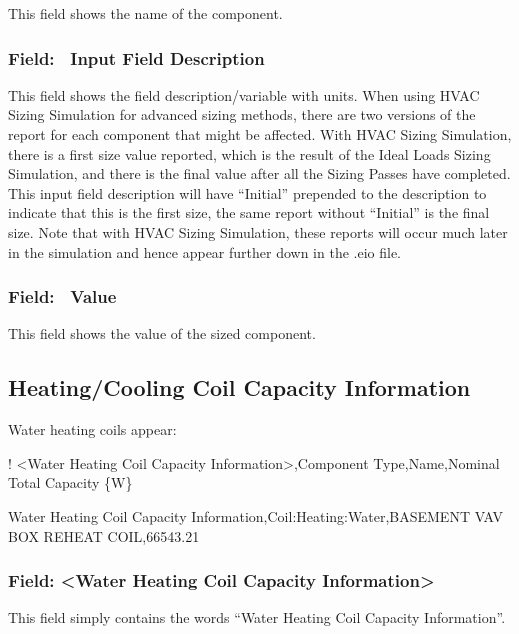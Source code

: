 This field shows the name of the component.

\subsubsection{Field: ~Input Field Description}\label{field-input-field-description}

This field shows the field description/variable with units. When using HVAC Sizing Simulation for advanced sizing methods, there are two versions of the report for each component that might be affected. With HVAC Sizing Simulation, there is a first size value reported, which is the result of the Ideal Loads Sizing Simulation, and there is the final value after all the Sizing Passes have completed. This input field description will have ``Initial'' prepended to the description to indicate that this is the first size, the same report without ``Initial'' is the final size. Note that with HVAC Sizing Simulation, these reports will occur much later in the simulation and hence appear further down in the .eio file.

\subsubsection{Field: ~Value}\label{field-value-2}

This field shows the value of the sized component.

\subsection{Heating/Cooling Coil Capacity Information}\label{heatingcooling-coil-capacity-information}

Water heating coils appear:

! \textless{}Water Heating Coil Capacity Information\textgreater{},Component Type,Name,Nominal Total Capacity \{W\}

Water Heating Coil Capacity Information,Coil:Heating:Water,BASEMENT VAV BOX REHEAT COIL,66543.21

\subsubsection{Field: \textless{}Water Heating Coil Capacity Information\textgreater{}}\label{field-water-heating-coil-capacity-information}

This field simply contains the words ``Water Heating Coil Capacity Information''.


